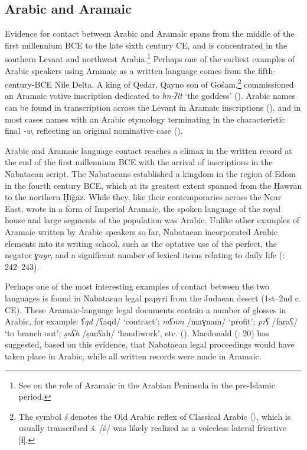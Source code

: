\documentclass[output=paper]{langsci/langscibook}
\begin{document}
\subsection{Arabic and Aramaic}
Evidence for contact between Arabic and Aramaic spans from the middle of the first millennium BCE to the late sixth century CE, and is concentrated in the southern Levant and northwest Arabia.\footnote{See \citet{Stein2018} on the role of Aramaic in the Arabian Peninsula in the pre-Islamic period.} Perhaps one of the earliest examples of Arabic speakers using Aramaic as a written language comes from the fifth-century-BCE Nile Delta. A king of Qedar, Qayno  son of Gośam,\footnote{The symbol \textit{ś} denotes the Old Arabic reflex of Classical Arabic 〈{}〉, which is usually transcribed \textit{š}. /ś/ was likely realized as a voiceless lateral fricative [ɬ].} commissioned an Aramaic votive inscription dedicated to \textit{hn-ʔlt} ‘the goddess’ (\citealt{Rabinowitz1956}). Arabic names can be found in transcription across the Levant in Aramaic inscriptions (\citealt{Israel1995}), and in most cases names with an Arabic etymology terminating in the characteristic final \textit{-w}, reflecting an original nominative case (\citealt{Al-Jalladforthcoming}). 

Arabic and Aramaic language contact reaches a climax in the written record at the end of the first millennium BCE with the arrival of inscriptions in the Nabataean script. The Nabataeans established a kingdom in the region of Edom in the fourth century BCE, which at its greatest extent spanned from the Ḥawrān to the northern Ḥiǧāz. While they, like their contemporaries across the Near East, wrote in a form of Imperial Aramaic, the spoken language of the royal house and large segments of the population was Arabic. Unlike other examples of Aramaic written by Arabic speakers so far, Nabataean incorporated Arabic elements into its writing school, such as the optative use of the perfect, the negator \textit{ɣayr}, and a significant number of lexical items relating to daily life (\citealt{Gzella2015}: 242--243).

Perhaps one of the most interesting examples of contact between the two languages is found in Nabataean legal papyri from the Judaean desert (1st--2nd c. CE). These Aramaic-language legal documents contain a number of glosses in Arabic, for example: \textit{ʕqd} /ʕaqd/ ‘contract’; \textit{mʕnm} /maɣnam/ ‘profit’; \textit{prʕ} /faraʕ/ ‘to branch out’; \textit{ṣnʕh} /ṣanʕah/ ‘handiwork’, etc. (\citealt{Yardeni2014}). Macdonald (\citeyear{Macdonald2010}: 20) has suggested, based on this evidence, that Nabataean legal proceedings would have taken place in Arabic, while all written records were made in Aramaic.
\end{document}
